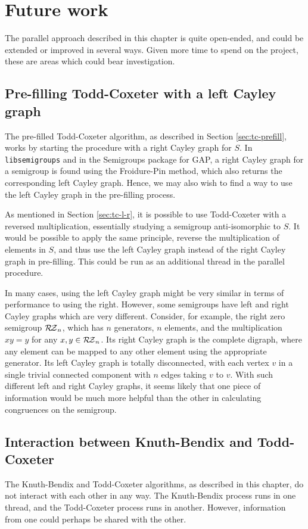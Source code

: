 \section{Future work}

The parallel approach described in this chapter is quite open-ended, and could
be extended or improved in several ways.  Given more time to spend on the
project, these are areas which could bear investigation.

\subsection{Pre-filling Todd-Coxeter with a left Cayley graph}
\label{sec:prefill-left}
The pre-filled Todd-Coxeter algorithm, as described in Section
\ref{sec:tc-prefill}, works by starting the procedure with a right Cayley graph
for $S$.  In \texttt{libsemigroups} and in the Semigroups package for GAP, a
right Cayley graph for a semigroup is found using the Froidure-Pin method, which
also returns the corresponding left Cayley graph.  Hence, we may also wish to
find a way to use the left Cayley graph in the pre-filling process.

As mentioned in Section \ref{sec:tc-l-r}, it is possible to use Todd-Coxeter
with a reversed multiplication, essentially studying a semigroup anti-isomorphic
to $S$.  It would be possible to apply the same principle, reverse the
multiplication of elements in $S$, and thus use the left Cayley graph instead of
the right Cayley graph in pre-filling.  This could be run as an additional
thread in the parallel procedure.

In many cases, using the left Cayley graph might be very similar in terms of
performance to using the right.  However, some semigroups have left and right
Cayley graphs which are very different.  Consider, for example, the right zero
semigroup $\mathcal{R\!Z}_n$, which has $n$ generators, $n$ elements, and the
multiplication $xy=y$ for any $x,y \in \mathcal{R\!Z}_n$.  Its right Cayley graph is the
complete digraph, where any element can be mapped to any other element using the
appropriate generator.  Its left Cayley graph is totally disconnected, with each
vertex $v$ in a single trivial connected component with $n$ edges taking $v$ to
$v$.  With such different left and right Cayley graphs, it seems likely that one
piece of information would be much more helpful than the other in calculating
congruences on the semigroup.

\subsection{Interaction between Knuth-Bendix and Todd-Coxeter}
\label{sec:linking-kb-tc}
The Knuth-Bendix and Todd-Coxeter algorithms, as described in this chapter, do
not interact with each other in any way.  The Knuth-Bendix process runs in one
thread, and the Todd-Coxeter process runs in another.  However, information from
one could perhaps be shared with the other.

